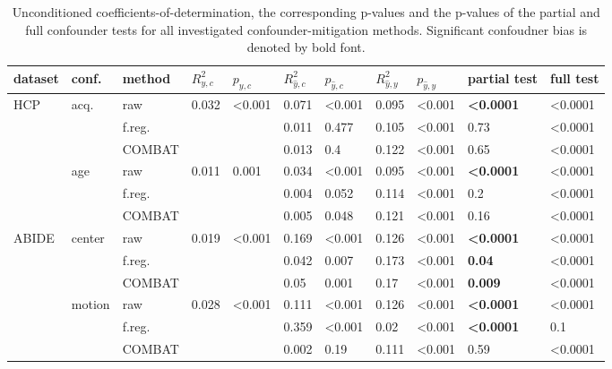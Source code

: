 \documentclass{article}
\begin{document}
\renewcommand{\arraystretch}{1.2}
\begin{table}
\centering
\begin{tabular}{lll|ll|ll|ll|ll} 
dataset & conf. & method & $R^2_{y, c}$ & $p_{y, c}$ & $R^2_{\hat{y}, c}$ & $p_{\hat{y}, c}$ & $R^2_{\hat{y}, y}$ & $p_{\hat{y}, y}$ & partial test & full test  \\
\hline
HCP & acq.  & raw      & 0.032 & <0.001 & 0.071 & <0.001  & 0.095 & <0.001 & \textbf{<0.0001} & <0.0001 \\
    &              & f.reg.    & & & 0.011 & 0.477 & 0.105  & <0.001  & 0.73 & <0.0001 \\
    &              & COMBAT    & & &0.013 & 0.4 & 0.122  & <0.001  & 0.65 & <0.0001\\
\hline
    & age   & raw       & 0.011 & 0.001  & 0.034 & <0.001  & 0.095  & <0.001 & \textbf{<0.0001} & <0.0001 \\
    &       & f.reg.    & & &0.004 & 0.052 & 0.114  & <0.001  & 0.2 & <0.0001 \\
    &       & COMBAT    & & &0.005 & 0.048 & 0.121 & <0.001 & 0.16 & <0.0001 \\
\hline
ABIDE   & center   & raw       & 0.019  & <0.001 &  0.169 & <0.001& 0.126     & <0.001 & \textbf{<0.0001} & <0.0001 \\
        &          & f.reg.    &  & &  0.042 & 0.007 & 0.173     & <0.001 & \textbf{0.04} & <0.0001 \\
        &          & COMBAT    &  & &  0.05 & 0.001 & 0.17     & <0.001 & \textbf{0.009} & <0.0001 \\
\hline
        & motion   & raw       & 0.028 & <0.001 & 0.111    &  <0.001 & 0.126    & <0.001 & \textbf{<0.0001} & <0.0001 \\
        &          & f.reg.    & & & 0.359    & <0.001  & 0.02   & <0.001 & \textbf{<0.0001} & 0.1 \\
        &          & COMBAT    & & &  0.002 & 0.19 & 0.111     & <0.001 & 0.59 & <0.0001 \\
    

\end{tabular}
\caption{\label{tab:unconditional-pvals} Unconditioned coefficients-of-determination, the corresponding p-values and the p-values of the partial and full confounder tests for all investigated confounder-mitigation methods. Significant confoudner bias is denoted by bold font.}
\end{table}

\end{document}

